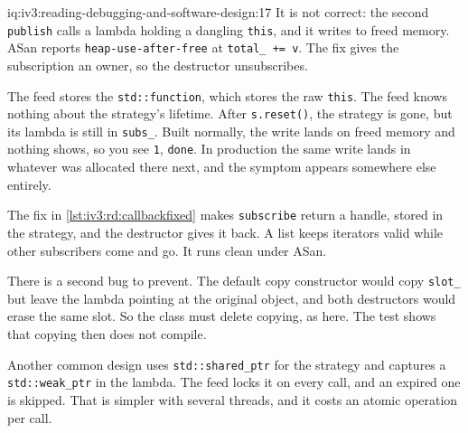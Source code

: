 \begin{solution}{iq:iv3:reading-debugging-and-software-design:17}
It is not correct: the second \texttt{publish} calls a lambda holding a dangling \texttt{this}, and it writes to freed memory. ASan reports \texttt{heap-use-after-free} at \texttt{total\_ += v}. The fix gives the subscription an owner, so the destructor unsubscribes.

The feed stores the \texttt{std::function}, which stores the raw \texttt{this}. The feed knows nothing about the strategy's lifetime. After \texttt{s.reset()}, the strategy is gone, but its lambda is still in \texttt{subs\_}. Built normally, the write lands on freed memory and nothing shows, so you see \texttt{1}, \texttt{done}. In production the same write lands in whatever was allocated there next, and the symptom appears somewhere else entirely.

The fix in \cref{lst:iv3:rd:callbackfixed} makes \texttt{subscribe} return a handle, stored in the strategy, and the destructor gives it back. A list keeps iterators valid while other subscribers come and go. It runs clean under ASan.

There is a second bug to prevent. The default copy constructor would copy \texttt{slot\_} but leave the lambda pointing at the original object, and both destructors would erase the same slot. So the class must delete copying, as here. The test shows that copying then does not compile.

Another common design uses \texttt{std::shared\_ptr} for the strategy and captures a \texttt{std::weak\_ptr} in the lambda. The feed locks it on every call, and an expired one is skipped. That is simpler with several threads, and it costs an atomic operation per call.

\label{lst:iv3:rd:callbackfixed}


\end{solution}

